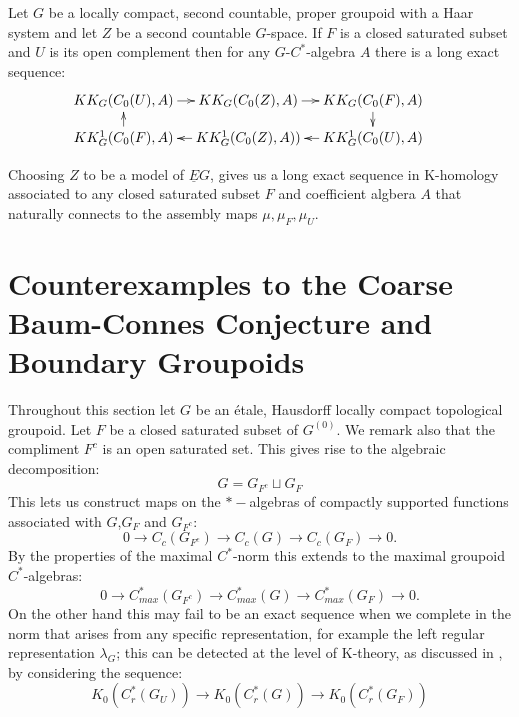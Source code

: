 \begin{conjecture}
{\begin{lemma}
Let $G$ be a locally compact, second countable, proper groupoid with a Haar system and let $Z$ be a second countable $G$-space. If $F$ is a closed saturated subset and $U$ is its open complement then for any $G$-$C^{*}$-algebra $A$ there is a long exact sequence:
\begin{equation*}
\xymatrix@=1em{
KK_{G}(C_{0}(U),A) \ar[r] & KK_{G}(C_{0}(Z),A) \ar[r]& KK_{G}(C_{0}(F),A)\ar[d] & \\
KK^{1}_{G}(C_{0}(F),A)\ar[u]& KK^{1}_{G}(C_{0}(Z),A)) \ar[l]& KK^{1}_{G}(C_{0}(U),A)\ar[l] &
}
\end{equation*}
\end{lemma}

Choosing $Z$ to be a model of $\underline{E}G$, gives us a long exact sequence in K-homology associated to any closed saturated subset $F$ and coefficient algbera $A$ that naturally connects to the assembly maps $\mu, \mu_{F}, \mu_{U}$.

\section{Counterexamples to the Coarse Baum-Connes Conjecture and Boundary Groupoids}\label{Sect:CE}

Throughout this section let $G$ be an \'etale, Hausdorff locally compact topological groupoid. Let $F$ be a closed saturated subset of $G^{(0)}$. We remark also that the compliment $F^{c}$ is an open saturated set. This gives rise to the algebraic decomposition:
\begin{equation*}
G = G_{F^{c}}\sqcup G_{F}
\end{equation*}
This lets us construct maps on the $*-$algebras of compactly supported functions associated with $G$,$G_{F}$ and $G_{F^{c}}$:
\begin{equation*}
0 \rightarrow C_{c}(G_{F^{c}}) \rightarrow C_{c}(G) \rightarrow C_{c}(G_{F}) \rightarrow 0.
\end{equation*}
By the properties of the maximal $C^{*}$-norm this extends to the maximal groupoid $C^{*}$-algebras:
\begin{equation*}
0 \rightarrow C_{max}^{*}(G_{F^{c}}) \rightarrow C_{max}^{*}(G) \rightarrow C_{max}^{*}(G_{F}) \rightarrow 0.
\end{equation*}
On the other hand this may fail to be an exact sequence when we complete in the norm that arises from any specific representation, for example the left regular representation $\lambda_{G}$; this can be detected at the level of K-theory, as discussed in \cite{MR1911663}, by considering the sequence:
\begin{equation}\label{eqn:neim}
K_{0}(C^{*}_{r}(G_{U}))\rightarrow K_{0}(C^{*}_{r}(G)) \rightarrow K_{0}(C^{*}_{r}(G_{F}))
\end{equation}

}
\end{conjecture}
